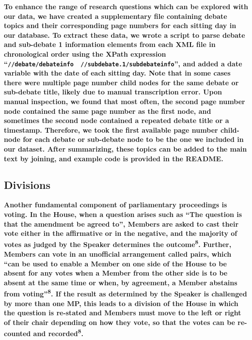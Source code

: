 \documentclass[
  letterpaper,
  DIV=11,
  numbers=noendperiod]{scrartcl}
\begin{document}
\textbf{To enhance the range of research questions which can be explored
with our data, we have created a supplementary file containing debate
topics and their corresponding page numbers for each sitting day in our
database. To extract these data, we wrote a script to parse debate and
sub-debate 1 information elements from each XML file in chronological
order using the XPath expression
``\texttt{//debate/debateinfo\ \textbar{}\ //subdebate.1/subdebateinfo}'',
and added a date variable with the date of each sitting day. Note that
in some cases there were multiple page number child nodes for the same
debate or sub-debate title, likely due to manual transcription error.
Upon manual inspection, we found that most often, the second page number
node contained the same page number as the first node, and sometimes the
second node contained a repeated debate title or a timestamp. Therefore,
we took the first available page number child-node for each debate or
sub-debate node to be the one we included in our dataset. After
summarizing, these topics can be added to the main text by joining, and
example code is provided in the README.}

\hypertarget{divisions}{%
\subsection{Divisions}\label{divisions}}

\textbf{Another fundamental component of parliamentary proceedings is
voting. In the House, when a question arises such as ``The question is
that the amendment be agreed to'', Members are asked to cast their vote
either in the affirmative or in the negative, and the majority of votes
as judged by the Speaker determines the outcome\textsuperscript{8}.
Further, Members can vote in an unofficial arrangement called pairs,
which ``can be used to enable a Member on one side of the House to be
absent for any votes when a Member from the other side is to be absent
at the same time or when, by agreement, a Member abstains from
voting''\textsuperscript{8}. If the result as determined by the Speaker
is challenged by more than one MP, this leads to a division of the House
in which the question is re-stated and Members must move to the left or
right of their chair depending on how they vote, so that the votes can
be re-counted and recorded\textsuperscript{8}.}
\end{document}
